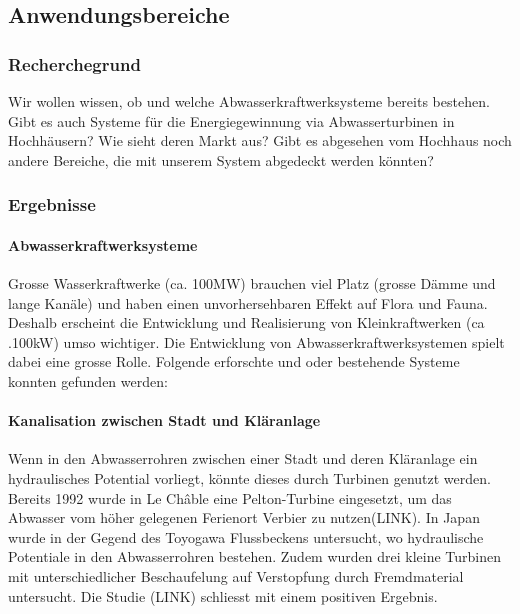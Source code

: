 \subsection{Anwendungsbereiche}
\subsubsection{Recherchegrund}
Wir wollen wissen, ob und welche Abwasserkraftwerksysteme bereits bestehen. Gibt es auch Systeme für die Energiegewinnung via Abwasserturbinen in Hochhäusern? Wie sieht deren Markt aus? Gibt es abgesehen vom Hochhaus noch andere Bereiche, die mit unserem System abgedeckt werden könnten?
\subsubsection{Ergebnisse}
\paragraph{Abwasserkraftwerksysteme}
Grosse Wasserkraftwerke (ca. 100\si{MW}) brauchen viel Platz (grosse Dämme und lange Kanäle) und haben einen unvorhersehbaren Effekt auf Flora und Fauna. Deshalb erscheint die Entwicklung und Realisierung von Kleinkraftwerken (ca .100\si{kW}) umso wichtiger. Die Entwicklung von Abwasserkraftwerksystemen spielt dabei eine grosse Rolle. Folgende erforschte und oder bestehende Systeme konnten gefunden werden:
\paragraph{Kanalisation zwischen Stadt und Kläranlage}
Wenn in den Abwasserrohren zwischen einer Stadt und deren Kläranlage ein hydraulisches Potential vorliegt, könnte dieses durch Turbinen genutzt werden. Bereits 1992 wurde in Le Châble eine Pelton-Turbine eingesetzt, um das Abwasser vom höher gelegenen Ferienort Verbier zu nutzen(LINK). In Japan wurde in der Gegend des Toyogawa Flussbeckens untersucht, wo hydraulische Potentiale in den Abwasserrohren bestehen. Zudem wurden drei kleine Turbinen mit unterschiedlicher Beschaufelung auf Verstopfung durch Fremdmaterial untersucht. Die Studie (LINK) schliesst mit einem positiven Ergebnis.
